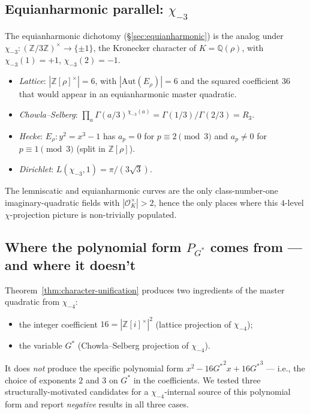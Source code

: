 \documentclass[11pt]{article}
\theoremstyle{definition}
\theoremstyle{remark}
\newcommand{\Gs}{G^{*}}
\newcommand{\Gss}{{G^{*}}^{2}}
\newcommand{\Gsss}{{G^{*}}^{3}}
\newcommand{\Z}{\mathbb{Z}}
\newcommand{\Q}{\mathbb{Q}}
\newcommand{\Aut}{\mathrm{Aut}}
\begin{document}
\subsection{Equianharmonic parallel: $\chi_{-3}$}

The equianharmonic dichotomy (\S\ref{sec:equianharmonic}) is the analog
under $\chi_{-3}: (\Z/3\Z)^\times \to \{\pm 1\}$, the Kronecker character
of $K = \Q(\rho)$, with $\chi_{-3}(1) = +1$, $\chi_{-3}(2) = -1$.
\begin{itemize}[leftmargin=*, itemsep=2pt]
\item \emph{Lattice}: $|\Z[\rho]^\times| = 6$, with $|\Aut(E_\rho)| = 6$ and
the squared coefficient $36$ that would appear in an equianharmonic master
quadratic.
\item \emph{Chowla--Selberg}: $\prod_a \Gamma(a/3)^{\chi_{-3}(a)} = \Gamma(1/3)/\Gamma(2/3) = R_3$.
\item \emph{Hecke}: $E_\rho: y^2 = x^3 - 1$ has $a_p = 0$ for
$p \equiv 2 \pmod 3$ and $a_p \neq 0$ for $p \equiv 1 \pmod 3$ (split in
$\Z[\rho]$).
\item \emph{Dirichlet}: $L(\chi_{-3}, 1) = \pi/(3\sqrt 3)$.
\end{itemize}
The lemniscatic and equianharmonic curves are the only class-number-one
imaginary-quadratic fields with $|\mathcal{O}_K^\times| > 2$, hence the
only places where this $4$-level $\chi$-projection picture is non-trivially
populated.

\subsection{Where the polynomial form $P_{\Gs}$ comes from --- and where it doesn't}\label{sec:not-CM-derived}

Theorem~\ref{thm:character-unification} produces two ingredients of the
master quadratic from $\chi_{-4}$:
\begin{itemize}[leftmargin=*, itemsep=2pt]
\item the integer coefficient $16 = |\Z[i]^\times|^2$ (lattice projection of $\chi_{-4}$);
\item the variable $\Gs$ (Chowla--Selberg projection of $\chi_{-4}$).
\end{itemize}
It does \emph{not} produce the specific polynomial form
$x^2 - 16\Gss x + 16\Gsss$ --- i.e., the choice of exponents $2$ and $3$
on $\Gs$ in the coefficients. We tested three structurally-motivated
candidates for a $\chi_{-4}$-internal source of this polynomial form
and report \emph{negative} results in all three cases.
\end{document}
